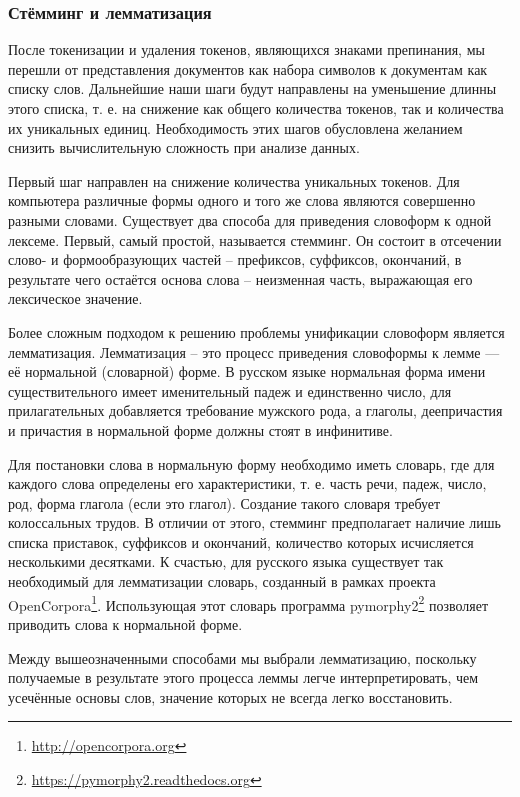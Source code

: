 \subsubsection{Стёмминг и лемматизация}
После токенизации и удаления токенов, являющихся знаками препинания, мы перешли от представления документов как набора символов к документам как списку слов. Дальнейшие наши шаги будут направлены на уменьшение длинны этого списка, т. е. на снижение как общего количества токенов, так и количества их уникальных единиц. Необходимость этих шагов обусловлена желанием снизить вычислительную сложность при анализе данных.

Первый шаг направлен на снижение количества уникальных токенов. Для компьютера различные формы одного и того же слова являются совершенно разными словами. Существует два способа для приведения словоформ к одной лексеме. Первый, самый простой, называется стемминг. Он состоит в отсечении слово- и формообразующих частей -- префиксов, суффиксов, окончаний, в результате чего остаётся основа слова -- неизменная часть, выражающая его лексическое значение.

Более сложным подходом к решению проблемы унификации словоформ является лемматизация. Лемматизация -- это процесс приведения словоформы к лемме — её нормальной (словарной) форме. В русском языке нормальная форма имени существительного имеет именительный падеж и единственно число, для прилагательных добавляется требование мужского рода, а глаголы, деепричастия и причастия в нормальной форме должны стоят в инфинитиве.

Для постановки слова в нормальную форму необходимо иметь словарь, где для каждого слова определены его характеристики, т. е. часть речи, падеж, число, род, форма глагола (если это глагол). Создание такого словаря требует колоссальных трудов. В отличии от этого, стемминг предполагает наличие лишь списка приставок, суффиксов и окончаний, количество которых исчисляется несколькими десятками. К счастью, для русского языка существует так необходимый для лемматизации словарь, созданный в рамках проекта OpenCorpora\footnote{\href{http://opencorpora.org}{http://opencorpora.org}}. Использующая этот словарь программа pymorphy2\footnote{\href{https://pymorphy2.readthedocs.org}{https://pymorphy2.readthedocs.org}} позволяет приводить слова к нормальной форме.

Между вышеозначенными способами мы выбрали лемматизацию, поскольку получаемые в результате этого процесса леммы легче интерпретировать, чем усечённые основы слов, значение которых не всегда легко восстановить.

